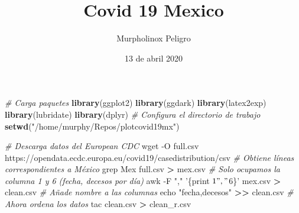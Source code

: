 \documentclass[]{article}
\title{Covid 19 Mexico}
\author{Murpholinox Peligro}
\date{13 de abril 2020}
\newenvironment{Shaded}{\begin{snugshade}}{\end{snugshade}}
\newcommand{\BuiltInTok}[1]{#1}
\newcommand{\CommentTok}[1]{\textcolor[rgb]{0.56,0.35,0.01}{\textit{#1}}}
\newcommand{\FunctionTok}[1]{\textcolor[rgb]{0.00,0.00,0.00}{#1}}
\newcommand{\KeywordTok}[1]{\textcolor[rgb]{0.13,0.29,0.53}{\textbf{#1}}}
\newcommand{\NormalTok}[1]{#1}
\newcommand{\OperatorTok}[1]{\textcolor[rgb]{0.81,0.36,0.00}{\textbf{#1}}}
\newcommand{\StringTok}[1]{\textcolor[rgb]{0.31,0.60,0.02}{#1}}
\begin{document}
\maketitle

\begin{Shaded}
\begin{Highlighting}[]
\CommentTok{# Carga paquetes}
\KeywordTok{library}\NormalTok{(ggplot2)}
\KeywordTok{library}\NormalTok{(ggdark)}
\KeywordTok{library}\NormalTok{(latex2exp)}
\KeywordTok{library}\NormalTok{(lubridate)}
\KeywordTok{library}\NormalTok{(dplyr)}
\CommentTok{# Configura el directorio de trabajo}
\KeywordTok{setwd}\NormalTok{(}\StringTok{"/home/murphy/Repos/plotcovid19mx"}\NormalTok{)}
\end{Highlighting}
\end{Shaded}

\begin{Shaded}
\begin{Highlighting}[]
\CommentTok{# Descarga datos del European CDC}
\FunctionTok{wget}\NormalTok{ -O full.csv https://opendata.ecdc.europa.eu/covid19/casedistribution/csv}
\CommentTok{# Obtiene líneas correspondientes a México}
\FunctionTok{grep}\NormalTok{ Mex full.csv }\OperatorTok{>}\NormalTok{ mex.csv}
\CommentTok{# Solo ocupamos la columna 1 y 6  (fecha, decesos por día)}
\FunctionTok{awk}\NormalTok{ -F }\StringTok{","} \StringTok{'\{print $1"," $6\}'}\NormalTok{ mex.csv }\OperatorTok{>}\NormalTok{ clean.csv}
\CommentTok{# Añade nombre a las columnas}
\BuiltInTok{echo} \StringTok{"fecha,decesos"} \OperatorTok{>>}\NormalTok{ clean.csv}
\CommentTok{# Ahora ordena los datos}
\FunctionTok{tac}\NormalTok{ clean.csv }\OperatorTok{>}\NormalTok{ clean_r.csv}
\end{Highlighting}
\end{Shaded}
\end{document}
